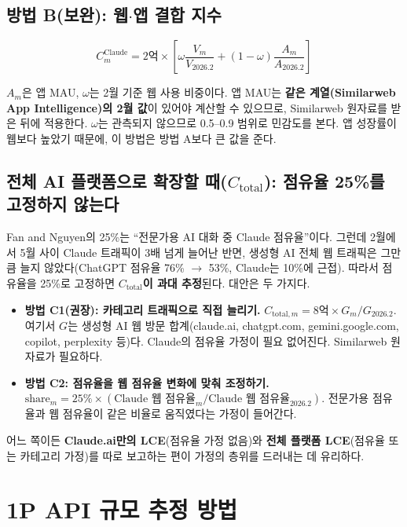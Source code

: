 \documentclass[11pt]{article}
\begin{document}
\subsection{방법 B(보완): 웹$\cdot$앱 결합 지수}

\begin{equation*}
C^{\text{Claude}}_m = 2\text{억} \times \left[\omega \frac{V_m}{V_{2026.2}} + (1-\omega)\frac{A_m}{A_{2026.2}}\right]
\end{equation*}

$A_m$은 앱 MAU, $\omega$는 2월 기준 웹 사용 비중이다. 앱 MAU는 \textbf{같은 계열(Similarweb App Intelligence)의 2월 값}이 있어야 계산할 수 있으므로, Similarweb 원자료를 받은 뒤에 적용한다. $\omega$는 관측되지 않으므로 0.5--0.9 범위로 민감도를 본다. 앱 성장률이 웹보다 높았기 때문에, 이 방법은 방법 A보다 큰 값을 준다.

\subsection{전체 AI 플랫폼으로 확장할 때($C_{\text{total}}$): 점유율 25\%를 고정하지 않는다}

Fan and Nguyen의 25\%는 ``전문가용 AI 대화 중 Claude 점유율''이다. 그런데 2월에서 5월 사이 Claude 트래픽이 3배 넘게 늘어난 반면, 생성형 AI 전체 웹 트래픽은 그만큼 늘지 않았다(ChatGPT 점유율 76\% $\to$ 53\%, Claude는 10\%에 근접). 따라서 점유율을 25\%로 고정하면 \textbf{$C_{\text{total}}$이 과대 추정}된다. 대안은 두 가지다.
\begin{itemize}
  \item \textbf{방법 C1(권장): 카테고리 트래픽으로 직접 늘리기.} $C_{\text{total},m} = 8\text{억}\times G_m/G_{2026.2}$. 여기서 $G$는 생성형 AI 웹 방문 합계(claude.ai, chatgpt.com, gemini.google.com, copilot, perplexity 등)다. Claude의 점유율 가정이 필요 없어진다. Similarweb 원자료가 필요하다.
  \item \textbf{방법 C2: 점유율을 웹 점유율 변화에 맞춰 조정하기.} $\text{share}_m = 25\%\times(\text{Claude 웹 점유율}_m/\text{Claude 웹 점유율}_{2026.2})$. 전문가용 점유율과 웹 점유율이 같은 비율로 움직였다는 가정이 들어간다.
\end{itemize}
어느 쪽이든 \textbf{Claude.ai만의 LCE}(점유율 가정 없음)와 \textbf{전체 플랫폼 LCE}(점유율 또는 카테고리 가정)를 따로 보고하는 편이 가정의 층위를 드러내는 데 유리하다.

\section{1P API 규모 추정 방법}
\end{document}
